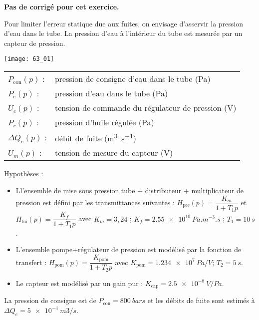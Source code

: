 \normaltrue \difficilefalse \tdifficilefalse
\correctionfalse

\setcounter{numques}{0}

\ifcorrection
\else
\textbf{Pas de corrigé pour cet exercice.}
\fi



Pour limiter l’erreur statique due aux fuites, on envisage d’asservir la pression d’eau dans le tube. 
La pression d’eau à l’intérieur du tube est mesurée par un capteur de pression. 

\begin{center}
\texttt{[image: 63\_01]}
\end{center}

 
 \begin{tabular}{lp{5cm}}
$P_{\text{con}}(p)$ : & 	pression de consigne d’eau dans le tube (Pa) \\
$P_e(p)$ : & 	pression d’eau dans le tube (Pa) \\
$U_c(p)$ : & 	tension de commande du régulateur de pression (V)\\
$P_r(p)$ : &	pression d’huile régulée (Pa)\\
$\Delta Q_e(p)$ :& 	débit de fuite (\si{m^3s^{-1}})\\
$U_m(p)$ 	:&	tension de mesure du capteur (V)\\
\end{tabular}
 
 Hypothèses :
\begin{itemize}
\item Ll’ensemble de mise sous pression {tube + distributeur + multiplicateur de pression} est défini par les transmittances suivantes : $H_{\text{pre}} (p)=\dfrac{K_m}{1+T_1 p}$	et	$H_{\text{fui}} (p)=\dfrac{K_f}{1+T_1 p}$ avec 	$K_m = 3,24$ ; 	$K_f = \SI{2,55e10}{Pa.m^{-3}.s}$ ; 	$T_1  = \SI{10}{s}$.
\item L’ensemble {pompe+régulateur de pression} est modélisé par la fonction de transfert :
$H_{\text{pom}} (p)=\dfrac{K_{\text{pom}}}{1+T_2 p}$  avec 	$K_{\text{pom}} = \SI{1,234e7}{Pa/V}$; 	$T_2 = \SI{5}{s}$.
\item Le capteur est modélisé par un gain pur :	$K_{\text{cap}} = \SI{2,5e-8}{V/Pa}$.
\end{itemize}
La pression de consigne est de $P_{\text{con}} = \SI{800}{bars}$ et les débits de fuite sont estimés à $\Delta Q_e = \SI{5e-4}{m3/s}$.

